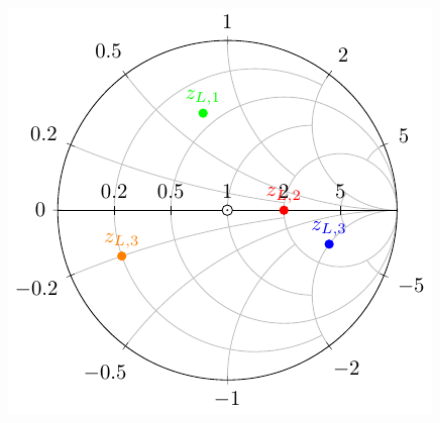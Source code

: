 \documentclass[10pt, compress]{beamer}
\begin{document}
\begin{frame}
\begin{columns}[T]
\begin{column}[T]{.6\textwidth}
\begin{figure}
                \includegraphics[width=1\textwidth]{smith simple impedances.pdf}
            \end{figure}
        \end{column}%
    \end{columns}
\end{frame}
\end{document}
